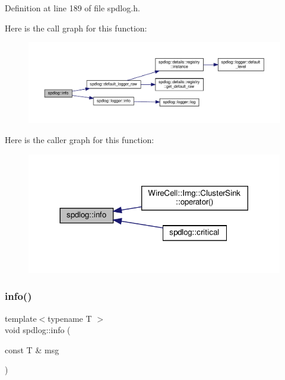 Definition at line 189 of file spdlog.\+h.

Here is the call graph for this function\+:
\nopagebreak
\begin{figure}[H]
\begin{center}
\leavevmode
\includegraphics[width=350pt]{namespacespdlog_a3ee2e37859d2eee2722afc8ac26319ae_cgraph}
\end{center}
\end{figure}
Here is the caller graph for this function\+:
\nopagebreak
\begin{figure}[H]
\begin{center}
\leavevmode
\includegraphics[width=317pt]{namespacespdlog_a3ee2e37859d2eee2722afc8ac26319ae_icgraph}
\end{center}
\end{figure}
\mbox{\label{namespacespdlog_ad68b6f9b65e1e8daab0117d75f0c39b4}} 
\subsubsection{\texorpdfstring{info()}{info()}\hspace{0.1cm}{\footnotesize\ttfamily [2/2]}}
{\footnotesize\ttfamily template$<$typename T $>$ \\
void spdlog\+::info (\begin{DoxyParamCaption}\item[{const T \&}]{msg }\end{DoxyParamCaption})\hspace{0.3cm}{\ttfamily [inline]}}



